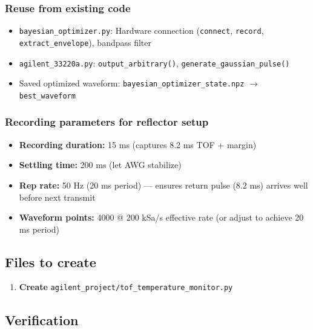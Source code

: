 \documentclass[11pt]{article}
\begin{document}
\subsubsection{Reuse from existing code}

\begin{itemize}
    \item \texttt{bayesian\_optimizer.py}: Hardware connection (\texttt{connect}, \texttt{record}, \texttt{extract\_envelope}), bandpass filter
    \item \texttt{agilent\_33220a.py}: \texttt{output\_arbitrary()}, \texttt{generate\_gaussian\_pulse()}
    \item Saved optimized waveform: \texttt{bayesian\_optimizer\_state.npz} $\rightarrow$ \texttt{best\_waveform}
\end{itemize}

\subsubsection{Recording parameters for reflector setup}

\begin{itemize}
    \item \textbf{Recording duration:} 15 ms (captures 8.2 ms TOF + margin)
    \item \textbf{Settling time:} 200 ms (let AWG stabilize)
    \item \textbf{Rep rate:} 50 Hz (20 ms period) --- ensures return pulse (8.2 ms) arrives well before next transmit
    \item \textbf{Waveform points:} 4000 @ 200 kSa/s effective rate (or adjust to achieve 20 ms period)
\end{itemize}

\subsection{Files to create}

\begin{enumerate}
    \item \textbf{Create} \texttt{agilent\_project/tof\_temperature\_monitor.py}
\end{enumerate}

\subsection{Verification}
\end{document}
